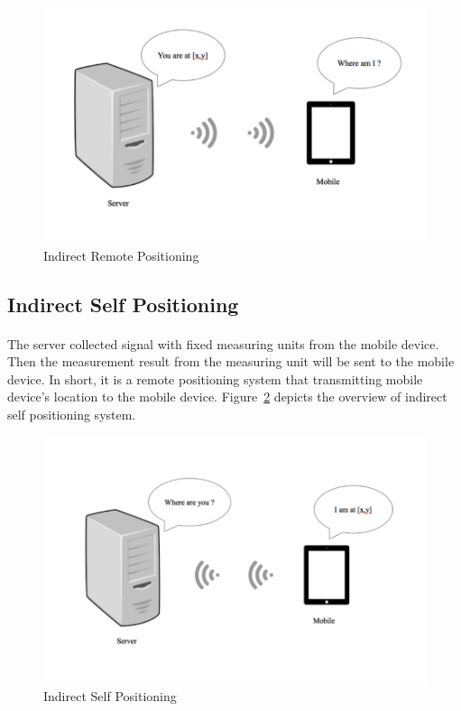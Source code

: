 \begin{figure}[h]
\centering
\includegraphics[width=\textwidth]{Image/indirect.png}
\caption{Indirect Remote Positioning}
\label{fig:indirect_remote}
\end{figure}


\newpage
\subsection{Indirect Self Positioning}
\paragraph{} The server collected signal with fixed measuring units from the mobile device. Then the measurement result from the measuring unit will be sent to the mobile device. In short, it is a remote positioning system that transmitting mobile device’s location to the mobile device. Figure~\ref{fig:indirect_self} depicts the overview of indirect self positioning system.

\begin{figure}[h]
\centering
\includegraphics[width=\textwidth]{Image/direct.png}
\caption{Indirect Self Positioning}
\label{fig:indirect_self}
\end{figure}


